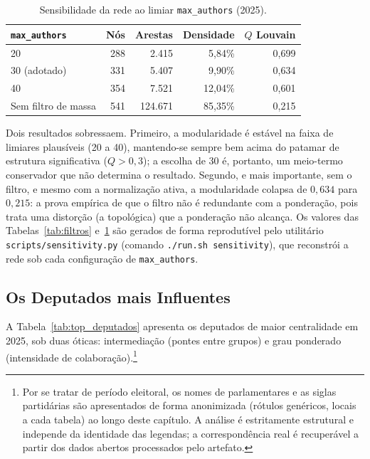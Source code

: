 \documentclass[
      12pt,
      a4paper,
      openright,
      oneside,
      chapter=TITLE,
      section=TITLE,
      english,
      french,
      spanish,
      brazilian
    ]{abntex2}
\begin{document}
    \begin{table}[H]
    \centering
    \caption{Sensibilidade da rede ao limiar \texttt{max\_authors} (2025).}
    \label{tab:sensibilidade}
    \begin{tabular}{lrrrr}
    \toprule
    \texttt{max\_authors} & \textbf{Nós} & \textbf{Arestas} & \textbf{Densidade} & \textbf{$Q$ Louvain} \\
    \midrule
    20                     & 288 & 2.415   & 5,84\%  & 0,699 \\
    30 (adotado)           & 331 & 5.407   & 9,90\%  & 0,634 \\
    40                     & 354 & 7.521   & 12,04\% & 0,601 \\
    Sem filtro de massa    & 541 & 124.671 & 85,35\% & 0,215 \\
    \bottomrule
    \end{tabular}
    \end{table}
    
    Dois resultados sobressaem. Primeiro, a modularidade é estável na faixa de limiares plausíveis (20 a 40), mantendo-se sempre bem acima do patamar de estrutura significativa ($Q > 0{,}3$); a escolha de 30 é, portanto, um meio-termo conservador que não determina o resultado. Segundo, e mais importante, sem o filtro, e mesmo com a normalização ativa, a modularidade colapsa de $0{,}634$ para $0{,}215$: a prova empírica de que o filtro não é redundante com a ponderação, pois trata uma distorção (a topológica) que a ponderação não alcança. Os valores das Tabelas~\ref{tab:filtros} e~\ref{tab:sensibilidade} são gerados de forma reprodutível pelo utilitário \texttt{scripts/sensitivity.py} (comando \texttt{./run.sh sensitivity}), que reconstrói a rede sob cada configuração de \texttt{max\_authors}.
    
    \subsection{Os Deputados mais Influentes}
    
    A Tabela~\ref{tab:top_deputados} apresenta os deputados de maior centralidade em 2025, sob duas óticas: intermediação (pontes entre grupos) e grau ponderado (intensidade de colaboração).\footnote{Por se tratar de período eleitoral, os nomes de parlamentares e as siglas partidárias são apresentados de forma anonimizada (rótulos genéricos, locais a cada tabela) ao longo deste capítulo. A análise é estritamente estrutural e independe da identidade das legendas; a correspondência real é recuperável a partir dos dados abertos processados pelo artefato.}
\end{document}
